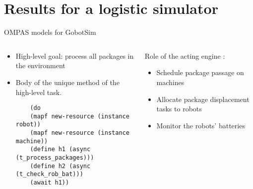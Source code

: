\section{Results for a logistic simulator}


\begin{frame}[fragile]{OMPAS models for GobotSim}
    \begin{columns}
        \begin{column}{0.5\textwidth}
            \begin{itemize}
                \item High-level goal: process all packages in the environment
                \item Body of the unique method of the high-level task.
                \setlength{\leftmargini}{0pt}
    
                \tiny
            \begin{lstlisting}
    (do
    (mapf new-resource (instance robot))
    (mapf new-resource (instance machine))
    (define h1 (async (t_process_packages)))
    (define h2 (async (t_check_rob_bat)))
    (await h1))
            \end{lstlisting}    
            \end{itemize}
    
    
            
        \end{column}
        \begin{column}{0.5\textwidth}
    Role of the acting engine : 
    \begin{itemize}
    \item Schedule package passage on machines
    \item Allocate package displacement tasks to robots
    \item Monitor the robots' batteries 
    \end{itemize} 
    \end{column}
    \end{columns}
    
    \end{frame}


